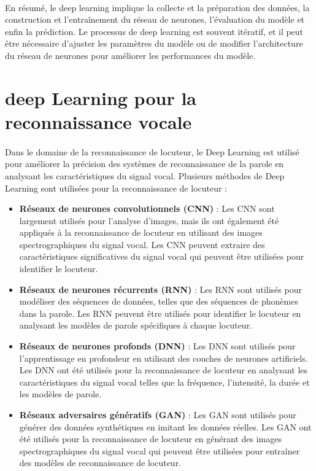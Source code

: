 \paragraph{}En résumé, le deep learning implique la collecte et la préparation des données, \cite{dlp}  la construction et l'entraînement du réseau de neurones, l'évaluation du modèle et enfin la prédiction. Le processus de deep learning est souvent itératif, et il peut être nécessaire d'ajuster les paramètres du modèle ou de modifier l'architecture du réseau de neurones pour améliorer les performances du modèle.

\newpage 
\newpage 
\section{deep Learning pour la reconnaissance vocale}

\paragraph{}Dans le domaine de la reconnaissance de locuteur, le Deep Learning est utilisé pour améliorer la précision des systèmes de reconnaissance de la parole en analysant les caractéristiques du signal vocal. Plusieurs méthodes de Deep Learning sont utilisées pour la reconnaissance de locuteur :
\begin{itemize}
    \item \textbf{Réseaux de neurones convolutionnels (CNN)} : Les CNN sont largement utilisés pour l'analyse d'images, mais ils ont également été appliqués à la reconnaissance de locuteur en utilisant des images spectrographiques du signal vocal. Les CNN peuvent extraire des caractéristiques significatives du signal vocal qui peuvent être utilisées pour identifier le locuteur.
    \item \textbf{Réseaux de neurones récurrents (RNN)} : Les RNN sont utilisés pour modéliser des séquences de données, telles que des séquences de phonèmes dans la parole. Les RNN peuvent être utilisés pour identifier le locuteur en analysant les modèles de parole spécifiques à chaque locuteur.
    \item \textbf{Réseaux de neurones profonds (DNN)} : Les DNN sont utilisés pour l'apprentissage en profondeur en utilisant des couches de neurones artificiels. Les DNN ont été utilisés pour la reconnaissance de locuteur en analysant les caractéristiques du signal vocal telles que la fréquence, l'intensité, la durée et les modèles de parole.
    \item \textbf{Réseaux adversaires génératifs (GAN)} : Les GAN sont utilisés pour générer des données synthétiques en imitant les données réelles. Les GAN ont été utilisés pour la reconnaissance de locuteur en générant des images spectrographiques du signal vocal qui peuvent être utilisées pour entraîner des modèles de reconnaissance de locuteur.
\end{itemize}
